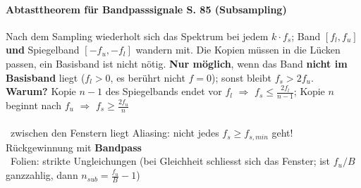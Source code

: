 \paragraph{Abtasttheorem für Bandpasssignale S. 85 (Subsampling)}
Nach dem Sampling wiederholt sich das Spektrum bei jedem $k \cdot f_s$; Band $[f_l, f_u]$ \textbf{und} Spiegelband $[-f_u, -f_l]$ wandern mit. Die Kopien müssen in die Lücken passen, ein Basisband ist nicht nötig. \textbf{Nur möglich}, wenn das Band \textbf{nicht im Basisband} liegt ($f_l > 0$, es berührt nicht $f = 0$); sonst bleibt $f_s > 2 f_u$.\\[.2em]

{\small \textbf{Warum?} Kopie $n-1$ des Spiegelbands endet vor $f_l$ $\Rightarrow$ $f_s \le \frac{2 f_l}{n-1}$; Kopie $n$ beginnt nach $f_u$ $\Rightarrow$ $f_s \ge \frac{2 f_u}{n}$}\\[.4em]
\\[.3em]
{\small \textrightarrow\ zwischen den Fenstern liegt Aliasing: nicht jedes $f_s \ge f_{s,min}$ geht! Rückgewinnung mit \textbf{Bandpass}}\\
{\small \textrightarrow\ Folien: strikte Ungleichungen (bei Gleichheit schliesst sich das Fenster; ist $f_u/B$ ganzzahlig, dann $n_{sub} = \frac{f_u}{B} - 1$)}
